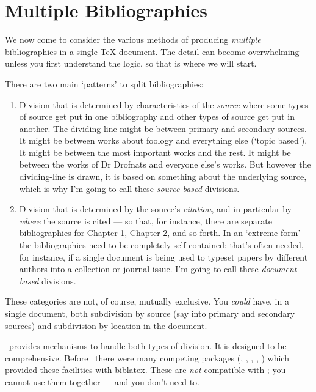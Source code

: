 \chapter{Multiple Bibliographies}\label{ch:subdivisions}


We now come to consider the various methods of producing
\emph{multiple} bibliographies in a single TeX document. The detail
can become overwhelming unless you first understand the logic, so that
is where we will start.

There are two main `patterns' to split bibliographies:

\begin{enumerate}
\item Division that is determined by characteristics of the
  \emph{source} where some types of source get put in one bibliography
  and other types of source get put in another. The dividing line
  might be between primary and secondary sources. It might be between
  works about foology and everything else (`topic based'). It might
  be between the most important works and the rest. It might be
  between the works of Dr Drofnats and everyone else's works. But
  however the dividing-line is drawn, it is based on something about
  the underlying source, which is why I'm going to call these
  \emph{source-based} divisions.
\item Division that is determined by the source's \emph{citation}, and
  in particular by \emph{where} the source is cited --- so that, for
  instance, there are separate bibliographies for Chapter 1, Chapter
  2, and so forth. In an `extreme form' the bibliographies need to
  be completely self-contained; that's often needed, for instance, if
  a single document is being used to typeset papers by different
  authors into a collection or journal issue. I'm going to call these
  \emph{document-based} divisions.
\end{enumerate}
These categories are not, of course, mutually exclusive. You
\emph{could} have, in a single document, both subdivision by source
(say into primary and secondary sources) and subdivision by location
in the document.

\biblatex\ provides mechanisms to handle both types of division. It is
designed to be comprehensive. Before \biblatex\ there were many
competing packages (, ,
, , ) which
provided these facilities with biblatex. These are \emph{not}
compatible with \biblatex; you cannot use them together --- and you
don't need to.

